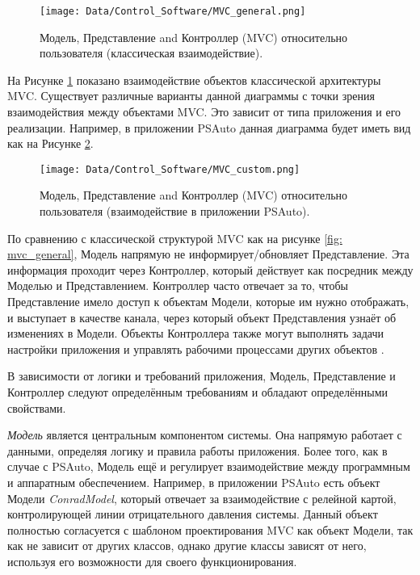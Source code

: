 \begin{figure}[ht]\centering
\texttt{[image: Data/Control\_Software/MVC\_general.png]}
\caption{Модель, Представление and Контроллер (MVC) относительно пользователя (классическая взаимодействие).}
\label{fig:mvc_general}
\end{figure}

На Рисунке \ref{fig:mvc_general} показано взаимодействие объектов классической архитектуры MVC. Существует различные варианты данной диаграммы с точки зрения взаимодействия между объектами MVC. Это зависит от типа приложения и его реализации. Например, в приложении PSAuto данная диаграмма будет иметь вид как на Рисунке \ref{fig:mvc_custom}.

\begin{figure}[ht]\centering
\texttt{[image: Data/Control\_Software/MVC\_custom.png]}
\caption{Модель, Представление and Контроллер (MVC) относительно пользователя (взаимодействие в приложении PSAuto).}
\label{fig:mvc_custom}
\end{figure}

По сравнению с классической структурой MVC как на рисунке \ref{fig: mvc_general}, Модель напрямую не информирует/обновляет Представление. Эта информация проходит через Контроллер, который действует как посредник между Моделью и Представлением. Контроллер часто отвечает за то, чтобы Представление имело доступ к объектам Модели, которые им нужно отображать, и выступает в качестве канала, через который объект Представления узнаёт об изменениях в Модели. Объекты Контроллера также могут выполнять задачи настройки приложения и управлять рабочими процессами других объектов \cite{apple_MVC}.

В зависимости от логики и требований приложения, Модель, Представление и Контроллер следуют определённым требованиям и обладают определёнными свойствами.

\emph{Модель} является центральным компонентом системы. Она напрямую работает с данными, определяя логику и правила работы приложения. Более того, как в случае с PSAuto, Модель ещё и регулирует взаимодействие между программным и аппаратным обеспечением. Например, в приложении PSAuto есть объект Модели \emph{ConradModel}, который отвечает за взаимодействие с релейной картой, контролирующей линии отрицательного давления системы. Данный объект полностью согласуется с шаблоном проектирования MVC как объект Модели, так как не зависит от других классов, однако другие классы зависят от него, используя его возможности для своего функционирования.

